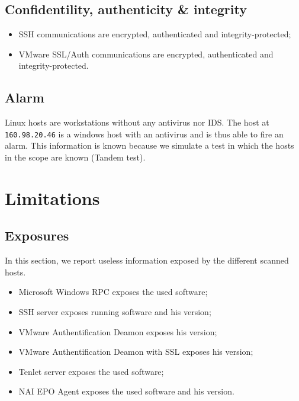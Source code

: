 \documentclass[10pt,a4paper,twoside,onecolumn]{article}
\begin{document}
\subsection{Confidentility, authenticity \& integrity}

\begin{itemize}
	\setlength{\itemsep}{-3mm}
	\item SSH communications are encrypted, authenticated and integrity-protected;
	\item VMware SSL/Auth communications are encrypted, authenticated and integrity-protected.
\end{itemize}

\subsection{Alarm}

Linux hosts are workstations without any antivirus nor IDS. The host at \texttt{160.98.20.46} is a windows host with an antivirus and is thus able to fire an alarm. This information is known because we simulate a test in which the hosts in the scope are known (Tandem test).


\section{Limitations}

\subsection{Exposures}

In this section, we report useless information exposed by the different scanned hosts.

\begin{itemize}
	\setlength{\itemsep}{-3mm}
	\item Microsoft Windows RPC exposes the used software;
	\item SSH server exposes running software and his version;
	\item VMware Authentification Deamon exposes his version;
	\item VMware Authentification Deamon with SSL exposes his version;
	\item Tenlet server exposes the used software;
	\item NAI EPO Agent exposes the used software and his version.
\end{itemize}
\end{document}
